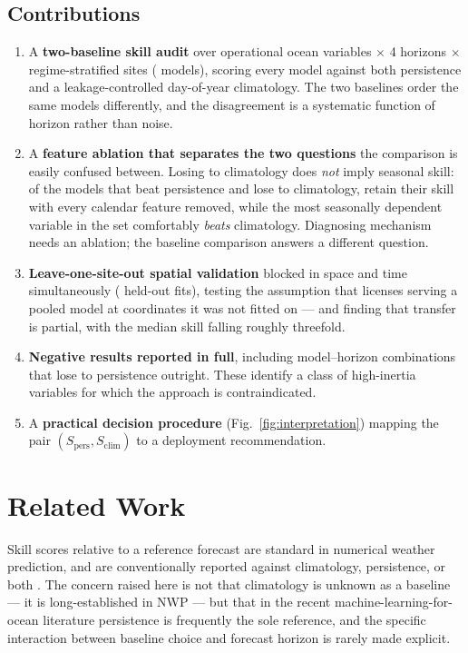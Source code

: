 \subsection{Contributions}

\begin{enumerate}\itemsep2pt
\item A \textbf{two-baseline skill audit} over \NVars{} operational ocean
variables $\times$ 4 horizons $\times$ \NSites{} regime-stratified sites
(\NModels{} models), scoring every model against both persistence and a
leakage-controlled day-of-year climatology. The two baselines order the same
models differently, and the disagreement is a systematic function of horizon
rather than noise.
\item A \textbf{feature ablation that separates the two questions} the
comparison is easily confused between. Losing to climatology does \emph{not}
imply seasonal skill: of the \NFlattered{} models that beat persistence and
lose to climatology, \NFlatteredNonSeasonal{} retain their skill with every
calendar feature removed, while the most seasonally dependent variable in the
set comfortably \emph{beats} climatology. Diagnosing mechanism needs an
ablation; the baseline comparison answers a different question.
\item \textbf{Leave-one-site-out spatial validation} blocked in space and time
simultaneously (\NLosoFits{} held-out fits), testing the assumption that
licenses serving a pooled model at coordinates it was not fitted on --- and
finding that transfer is partial, with the median skill falling roughly
threefold.
\item \textbf{Negative results reported in full}, including \NLoseToPers{}
model--horizon combinations that lose to persistence outright. These identify
a class of high-inertia variables for which the approach is contraindicated.
\item A \textbf{practical decision procedure} (Fig.~\ref{fig:interpretation})
mapping the pair $(S_{\mathrm{pers}}, S_{\mathrm{clim}})$ to a deployment
recommendation.
\end{enumerate}

\section{Related Work}

Skill scores relative to a reference forecast are standard in numerical weather
prediction, and are conventionally reported against climatology, persistence,
or both \citep{jolliffe2012,murphy1988}. The concern raised here is not that
climatology is unknown as a baseline --- it is long-established in NWP --- but
that in the recent machine-learning-for-ocean literature persistence is
frequently the sole reference, and the specific interaction between baseline
choice and forecast horizon is rarely made explicit.

